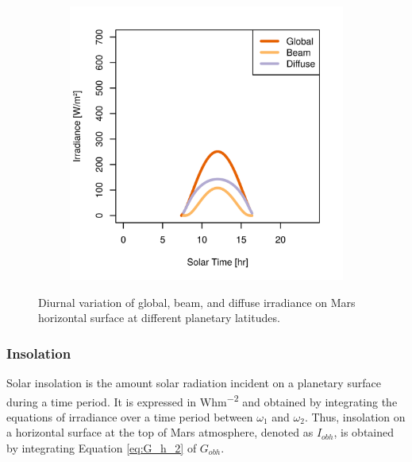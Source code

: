 \begin{figure}[h]
\begin{subfigure}[t]{\subfigureWidth}
  		\label{fig:sub:irradiance-phi-p20}
  	\end{subfigure}\hfill
	   \begin{subfigure}[t]{\subfigureWidth}
      \centering
  		\includegraphics[height=\graphicsHeight]{sections/mars-solar-energy/solar-radiation/plots/gh-gbh-gdh-variation-4-for-ls-248-phi-40-tau-05-and-albedo-027.png}
  		\label{fig:sub:irradiance-phi-p40}
	   \end{subfigure}\hfill
	\caption{Diurnal variation of global, beam, and diffuse irradiance on Mars horizontal surface at different planetary latitudes.}
	\label{fig:plot:irradiances-phi}
\vspace{-2ex}
\end{figure}

\clearpage
\subsubsection{Insolation}
\label{sec:MartianEnvironment:SolarRadiation:Insolation}

Solar insolation is the amount solar radiation incident on a planetary surface during a time period. It is expressed in \si{Whm^{-2}} and obtained by integrating the equations of irradiance over a time period between $\omega_1$ and $\omega_2$. Thus, insolation on a horizontal surface at the top of Mars atmosphere, denoted as $I_{obh}$, is obtained by integrating Equation \ref{eq:G_h_2} of $G_{obh}$.

